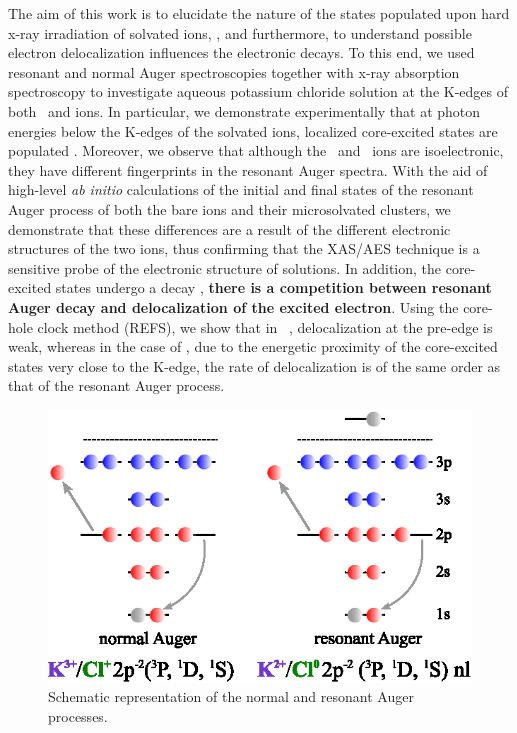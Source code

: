 The aim of this work is to elucidate the nature of the states populated upon hard x-ray irradiation of solvated ions, , and furthermore, to understand  possible electron delocalization  influences the electronic decays. To this end, we used resonant and normal Auger spectroscopies together with x-ray absorption spectroscopy to investigate aqueous potassium chloride solution at the K-edges of both \ki~and \cli ions. In particular, we demonstrate experimentally that at photon energies below the K-edges of the solvated ions, localized core-excited states are populated . Moreover, we observe that although the \ki~and \cli~ions are isoelectronic, they have different fingerprints in the resonant Auger spectra. With the aid of high-level {\it ab initio} calculations of the initial and final states of the resonant Auger process of both the bare ions and their microsolvated clusters, we demonstrate that these differences are a result of the different electronic structures of the two ions, thus confirming that the XAS/AES technique is a sensitive probe of the electronic structure of solutions. In addition, the core-excited states undergo a decay , \textbf{there is a competition between resonant Auger decay and delocalization of the excited electron}. Using the core-hole clock method (REFS), we show that in \ki~, delocalization at the pre-edge is weak, whereas in the case of \cli, due to the energetic proximity of the core-excited states very close to the K-edge, the rate of delocalization is of the same order as that of the resonant Auger process. 

\begin{figure}
\includegraphics{figures/auger_process.eps}
\caption{Schematic representation of the normal and resonant Auger processes.}
\label{fg:auger}
\end{figure}